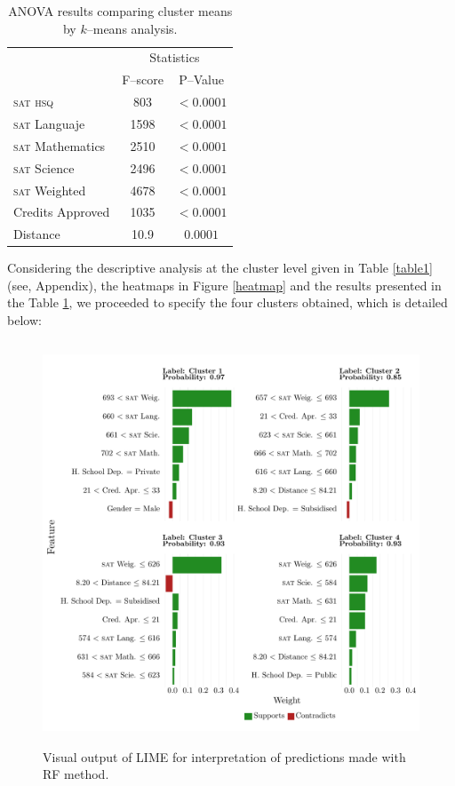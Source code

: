 \documentclass[5p,authoryear,preprint,12pt]{elsarticle}
\begin{document}
\begin{table}[tbp]
	\caption{ANOVA results comparing cluster means by $k$--means analysis.}
	\label{table2}
	\begin{tabular}{lcc}
		\toprule
		& \multicolumn{2}{c}{Statistics} \\
		&  F--score & P--Value\\
		\midrule
		\textsc{sat} \textsc{hsq}  &  803 & $<0.0001$   \\  
		\textsc{sat}  Languaje  & 1598  &$<0.0001$\\
		\textsc{sat}  Mathematics  &2510  &  $<0.0001$  \\
		\textsc{sat}  Science  &  2496  &  $<0.0001$    \\
		\textsc{sat}  Weighted  & 4678  &  $<0.0001$  \\
		Credits Approved  & 1035  &  $<0.0001$  \\
		Distance  &  10.9  &  $0.0001$  \\    
		\bottomrule
	\end{tabular}
\end{table}

Considering the descriptive analysis at the cluster level given in Table \ref{table1} (see, Appendix), the heatmaps in Figure \ref{heatmap} and the results presented in the Table \ref{table2}, we proceeded to specify the four clusters obtained, which is detailed below:

\begin{figure}[htb]
	\centering
	\includegraphics[clip,trim={0.1cm 0.5cm 0.3cm 0.2cm},width=15cm,height=12cm]{LIME1}
	\caption{Visual output of LIME for interpretation of predictions made with RF method.}
	\label{fig3}
\end{figure}
\end{document}

